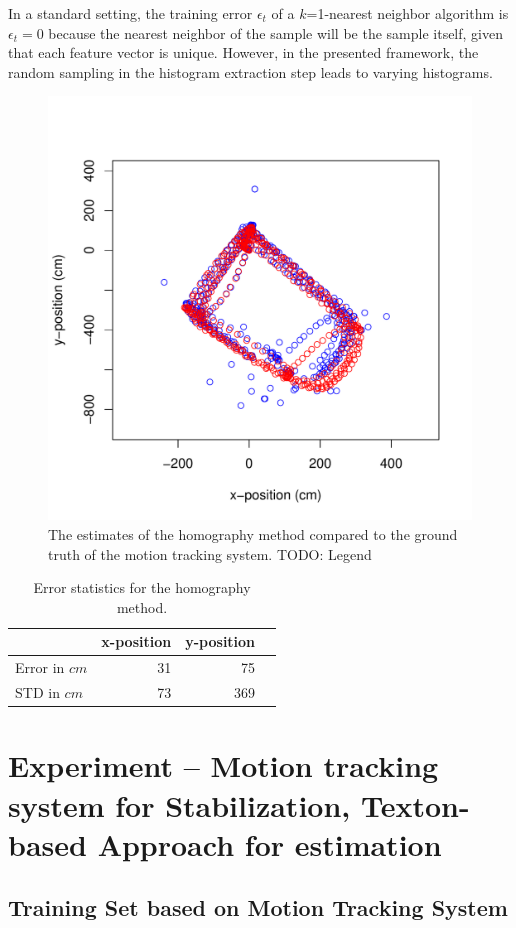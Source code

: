 \documentclass{report}
\begin{document}
In a standard setting, the training error $\epsilon_t$ of a
$k$=1-nearest neighbor algorithm is $\epsilon_t = 0$ because the
nearest neighbor of the sample will be the sample itself, given that
each feature vector is unique. However, in the presented framework,
the random sampling in the histogram extraction step leads to varying
histograms.

\begin{figure}[h!]
\begin{center}
\includegraphics[width=0.448\columnwidth]{SIFT_vs_OptiTrack}
\caption{{\label{fig:flightpath} The estimates of the homography
    method compared to the ground truth of the motion tracking system.
    TODO: Legend%
  }}
\end{center}
\end{figure}

\begin{table}[H]
  \centering
  \begin{tabular}{lrrr}
    \toprule
    & x-position & y-position\\
    \midrule
    Error in $cm$ & 31 & 75\\
    STD in $cm$ & 73 & 369\\
    \bottomrule
  \end{tabular}
  \caption[Error statistics homography method.]{Error statistics for the homography method.}
  \label{tab:homoerror}
\end{table}


\section{Experiment -- Motion tracking system for Stabilization,
  Texton-based Approach for estimation}

\subsection{Training Set based on Motion Tracking System}
\label{sec:experiment-real}
\end{document}
